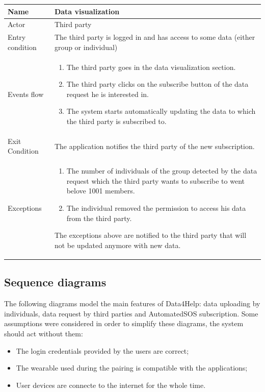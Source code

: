 \begin{table}[p]
\centering
\begin{tabular}{|l|p{11cm}|}
    \hline
    Name & Data visualization
    \\ \hline
    Actor & Third party
    \\ \hline 
    Entry condition & The third party is logged in and has access to some data (either group or individual)
        \\ \hline
    Events flow &
    \begin{enumerate}
    \item The third party goes in the data visualization section.
	\item The third party clicks on the subscribe button of the data request he is interested in.
	\item The system starts automatically updating the data to which the third party is subscribed to.
    \end{enumerate}
     \\ \hline
     Exit Condition & The application notifies the third party of the new subscription.
     \\
    \hline
    Exceptions &
        \begin{enumerate}
    \item The number of individuals of the group detected by the data request which the third party wants to subscribe to went belove 1001 members.
    \item The individual removed the permission to access his data from the third party.
\end{enumerate}  
 The exceptions above are notified to the third party that will not be updated anymore with new data.
  \\
    \hline
\end{tabular}
\end{table}





\newpage
\subsection{Sequence diagrams}
The following diagrams model the main features of Data4Help: data uploading by individuals, data request by third parties and AutomatedSOS subscription.
Some assumptions were considered in order to simplify these diagrams, the system should act without them:
\begin{itemize}
\item The login credentials provided by the users are correct;
\item The wearable used during the pairing is compatible with the applications;
\item User devices are connecte to the internet for the whole time.
\end{itemize}





